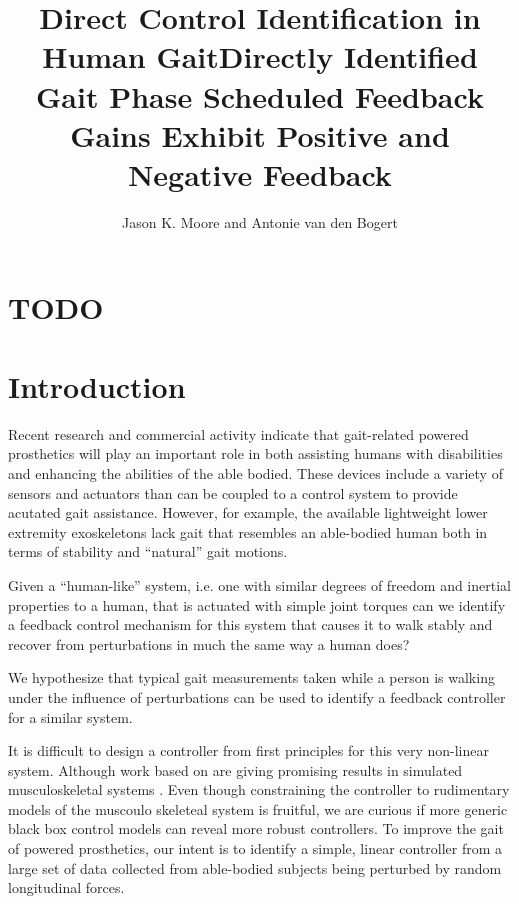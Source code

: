 \documentclass{article}
\author{Jason K. Moore and Antonie van den Bogert}
\title{Direct Control Identification in Human Gait}
\title{Directly Identified Gait Phase Scheduled Feedback Gains Exhibit Positive
  and Negative Feedback}
\date{}
\begin{document}
\maketitle

\section*{TODO}

\listoftodos

\begin{abstract}
\end{abstract}

\section*{Introduction}
%
Recent research and commercial activity indicate that gait-related powered
prosthetics will play an important role in both assisting humans with
disabilities and enhancing the abilities of the able bodied. These devices
include a variety of sensors and actuators than can be coupled to a control
system to provide acutated gait assistance. However, for example, the available
lightweight lower extremity exoskeletons lack gait that resembles an
able-bodied human both in terms of stability and ``natural'' gait motions.

Given a ``human-like'' system, i.e. one with similar degrees of freedom and
inertial properties to a human, that is actuated with simple joint torques can
we identify a feedback control mechanism for this system that causes it to
walk stably and recover from perturbations in much the same way a human does?

We hypothesize that typical gait measurements taken while a person is
walking under the influence of perturbations can be used to identify a
feedback controller for a similar system.

It is difficult to design a controller from first principles
for this very non-linear system. Although work based on \cite{Geyer2010} are
giving promising results in simulated musculoskeletal systems \cite{Wang2012,
Geitenbeek2013}. Even though constraining the controller to rudimentary models
of the muscoulo skeleteal system is fruitful, we are curious if more generic
black box control models can reveal more robust controllers. To improve the
gait of powered prosthetics, our intent is to identify a simple, linear
controller from a large set of data collected from able-bodied subjects being
perturbed by random longitudinal forces.
\end{document}
